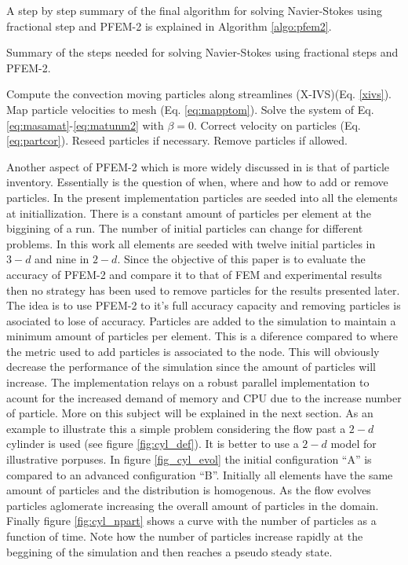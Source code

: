 A step by step summary of the final algorithm for solving Navier-Stokes using fractional step and PFEM-2 is explained in Algorithm \ref{algo:pfem2}.
\begin{algorithm}[H]
\caption{Summary of the steps needed for solving Navier-Stokes using fractional steps and PFEM-2.}
\label{algo:pfem2}
\begin{algorithmic}[1]
\STATE Compute the convection moving particles along streamlines (X-IVS)(Eq. \ref{xivs}).
\STATE Map particle velocities to mesh (Eq. \ref{eq:mapptom}).
\STATE Solve the system of Eq. \ref{eq:masamat}-\ref{eq:matunm2} with $\beta=0$.
\STATE Correct velocity on particles (Eq. \ref{eq:partcor}).
\STATE Reseed particles if necessary.
\STATE Remove particles if allowed.
\end{algorithmic}
\end{algorithm} 


Another aspect of PFEM-2 which is more widely discussed in \cite{gimenez-difusion} is that of particle inventory. Essentially is the question of when, where and how to add or remove particles. In the present implementation particles are seeded into all the elements at initiallization. There is a constant amount of particles per element at the biggining of a run. The number of initial particles can change for different problems. In this work all elements are seeded with twelve initial particles in $3-d$ and nine in $2-d$. Since the objective of this paper is to evaluate the accuracy of PFEM-2 and compare it to that of FEM and experimental results then no strategy has been used to remove particles for the results presented later. The idea is to use PFEM-2 to it's full accuracy capacity and removing particles is asociated to lose of accuracy. Particles are added to the simulation to maintain a minimum amount of particles per element. This is a diference compared to \cite{gimenez-difusion} where the metric used to add particles is associated to the node. This will obviously decrease the performance of the simulation since the amount of particles will increase. The implementation relays on a robust parallel implementation to acount for the increased demand of memory and CPU due to the increase number of particle. More on this subject will be explained in the next section. As an example to illustrate this a simple problem considering the flow past a $2-d$ cylinder is used (see figure \ref{fig:cyl_def}). It is better to use a $2-d$ model for illustrative porpuses. In figure \ref{fig_cyl_evol} the initial configuration ``A'' is compared to an advanced configuration ``B''. Initially all elements have the same amount of particles and the distribution is homogenous. As the flow evolves particles aglomerate increasing the overall amount of particles in the domain. Finally figure \ref{fig:cyl_npart} shows a curve with the number of particles as a function of time. Note how the number of particles increase rapidly at the beggining of the simulation and then reaches a pseudo steady state.


